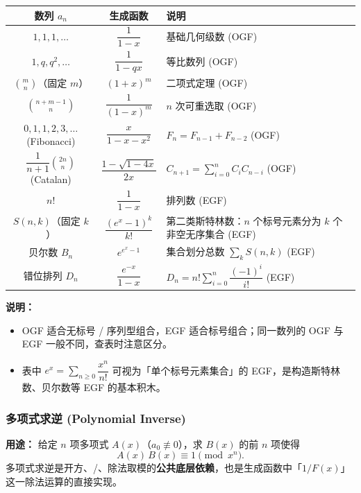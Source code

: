 \begin{center}
\begin{tabularx}{\textwidth}{|c|c|X|}
\hline
\textbf{数列 $a_n$} & \textbf{生成函数} & \textbf{说明} \\ \hline
$1,1,1,\dots$ & $\dfrac{1}{1-x}$ & 基础几何级数 (OGF) \\ \hline
$1,q,q^2,\dots$ & $\dfrac{1}{1-qx}$ & 等比数列 (OGF) \\ \hline
$\binom{m}{n}$（固定 $m$） & $(1+x)^m$ & 二项式定理 (OGF) \\ \hline
$\binom{n+m-1}{n}$ & $\dfrac{1}{(1-x)^m}$ & $n$ 次可重选取 (OGF) \\ \hline
$0,1,1,2,3,\dots$ (Fibonacci) & $\dfrac{x}{1-x-x^2}$ & $F_n=F_{n-1}+F_{n-2}$ (OGF) \\ \hline
$\dfrac{1}{n+1}\binom{2n}{n}$ (Catalan) & $\dfrac{1-\sqrt{1-4x}}{2x}$ & $C_{n+1}=\sum_{i=0}^{n}C_iC_{n-i}$ (OGF) \\ \hline
$n!$ & $\dfrac{1}{1-x}$ & 排列数 (EGF) \\ \hline
$S(n,k)$（固定 $k$） & $\dfrac{(e^x-1)^k}{k!}$ & 第二类斯特林数：$n$ 个标号元素分为 $k$ 个非空无序集合 (EGF) \\ \hline
贝尔数 $B_n$ & $e^{e^x-1}$ & 集合划分总数 $\sum_k S(n,k)$ (EGF) \\ \hline
错位排列 $D_n$ & $\dfrac{e^{-x}}{1-x}$ & $D_n=n!\sum_{i=0}^{n}\dfrac{(-1)^i}{i!}$ (EGF) \\ \hline
\end{tabularx}
\end{center}

\textbf{说明：}
\begin{itemize}
    \item OGF 适合无标号 / 序列型组合，EGF 适合标号组合；同一数列的 OGF 与 EGF 一般不同，查表时注意区分。
    \item 表中 $e^x=\sum_{n\ge 0}\dfrac{x^n}{n!}$ 可视为「单个标号元素集合」的 EGF，是构造斯特林数、贝尔数等 EGF 的基本积木。
\end{itemize}

\subsubsection{多项式求逆 (Polynomial Inverse)}

\textbf{用途：}  
给定 $n$ 项多项式 $A(x)$（$a_0\not\equiv 0$），求 $B(x)$ 的前 $n$ 项使得
\[ A(x)\,B(x) \equiv 1 \pmod{x^n}. \]
多项式求逆是开方、/、除法取模的\textbf{公共底层依赖}，也是生成函数中「$1/F(x)$」这一除法运算的直接实现。

